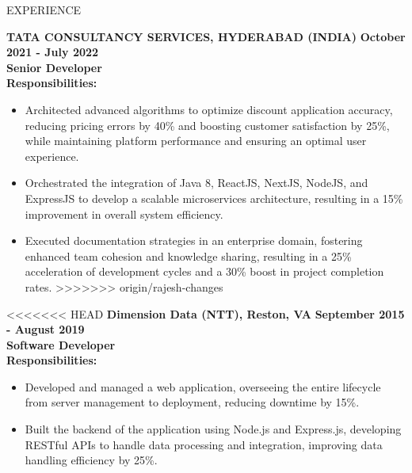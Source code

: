 \documentclass{resume} %
\begin{document}
\begin{rSection}{EXPERIENCE}
\begin{flushleft}
\begin{itemize}
        \vspace{1em} 
            \textbf{TATA CONSULTANCY SERVICES, HYDERABAD (INDIA)} \hfill \textbf{October 2021 {-} July 2022} \\
            \textbf{Senior Developer} \\
            \vspace{1em}
            \textbf{Responsibilities:} \\
            \begin{itemize}
                                    \item Architected advanced algorithms to optimize discount application accuracy, reducing pricing errors by 40\% and boosting customer satisfaction by 25\%, while maintaining platform performance and ensuring an optimal user experience.
                                    \item Orchestrated the integration of Java 8, ReactJS, NextJS, NodeJS, and ExpressJS to develop a scalable microservices architecture, resulting in a 15\% improvement in overall system efficiency.
                                    \item Executed documentation strategies in an enterprise domain, fostering enhanced team cohesion and knowledge sharing, resulting in a 25\% acceleration of development cycles and a 30\% boost in project completion rates.
>>>>>>> origin/rajesh-changes
                            \end{itemize}
            \vspace{0.5em}
<<<<<<< HEAD
            \textbf{Dimension Data (NTT), Reston, VA} \hfill \textbf{September 2015 {-} August 2019} \\
            \textbf{Software Developer} \\
            \vspace{1em}
            \textbf{Responsibilities:} \\
            \begin{itemize}
                                    \item Developed and managed a web application, overseeing the entire lifecycle from server management to deployment, reducing downtime by 15\%.
                                    \item Built the backend of the application using Node.js and Express.js, developing RESTful APIs to handle data processing and integration, improving data handling efficiency by 25\%.

\end{itemize}
\end{itemize}
\end{flushleft}
\end{rSection}
\end{document}
